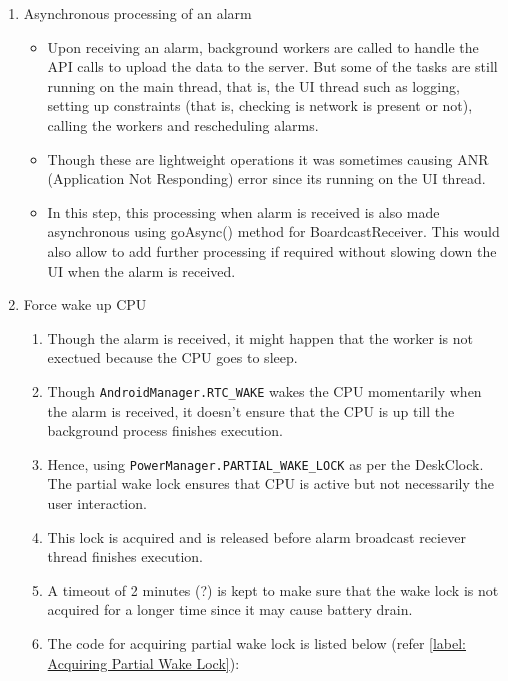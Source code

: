 \documentclass{article}
\begin{document}
\begin{enumerate}
\begin{enumerate}
\begin{itemize}
\begin{lstlisting}[caption={Updated PendingIntent for AlarmScheduling},label={label: Updated PendingIntent for AlarmScheduling}]
PendingIntent pendingIntent = PendingIntent.getBroadcast(
    context,
    requestCode,
    intent,
    PendingIntent.FLAG_IMMUTABLE | PendingIntent.FLAG_UPDATE_CURRENT
);
\end{lstlisting}  
        \end{itemize}
        \item Asynchronous processing of an alarm
        \begin{itemize}
            \item Upon receiving an alarm, background workers are called to handle the API calls to upload the data to the server. But some of the tasks are still running on the main thread, that is, the UI thread such as logging, setting up constraints (that is, checking is network is present or not), calling the workers and rescheduling alarms.
            \item Though these are lightweight operations it was sometimes causing ANR (Application Not Responding) error since its running on the UI thread.
            \item In this step, this processing when alarm is received is also made asynchronous using goAsync() method for BoardcastReceiver. This would also allow to add further processing if required without slowing down the UI when the alarm is received.
        \end{itemize}
        \item Force wake up CPU
        \begin{enumerate}
            \item Though the alarm is received, it might happen that the worker is not exectued because the CPU goes to sleep.
            \item Though \texttt{AndroidManager.RTC\_WAKE} wakes the CPU momentarily when the alarm is received, it doesn't ensure that the CPU is up till the background process finishes execution.
            \item Hence, using \texttt{PowerManager.PARTIAL\_WAKE\_LOCK} as per the DeskClock. The partial wake lock ensures that CPU is active but not necessarily the user interaction.
            \item This lock is acquired and is released before alarm broadcast reciever thread finishes execution. 
            \item A timeout of 2 minutes (?) is kept to make sure that the wake lock is not acquired for a longer time since it may cause battery drain.
            \item The code for acquiring partial wake lock is listed below (refer \ref{label: Acquiring Partial Wake Lock}): 

\end{enumerate}
\end{enumerate}
\end{enumerate}
\end{document}
